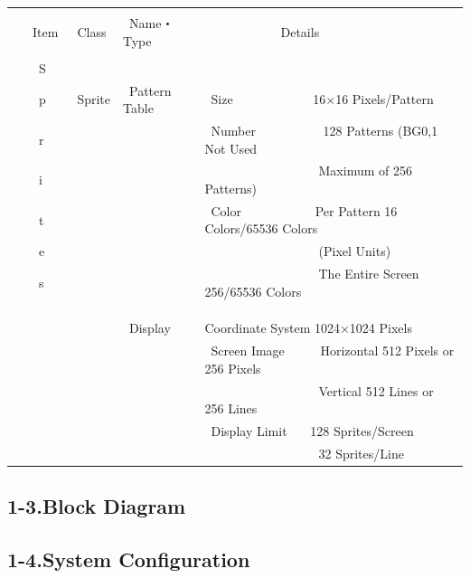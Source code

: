 \documentclass[twoside,a4paper,12pt]{article}
\begin{document}
\begin{tabular}{|p{17mm}|p{20mm}|p{27mm}|p{100mm}|}
\hline
& & &\\
\ \ \ Item & \ Class & \ Name・Type & \ \ \ \ \ \ \ \ \ \ \ \ Details\\[1mm]
\hline
& & &\\[-3mm]
\ \ \ \ S & & &\\[3mm]
\ \ \ \ p & \ Sprite & \ Pattern Table & \ Size \ \ \ \ \ \ \ \ \ \ \ \ 16×16 Pixels/Pattern\\[3mm]
\ \ \ \ r & & & \ Number \ \ \ \ \ \ \ \ \ \ 128 Patterns (BG0,1 Not Used\\[3mm]
\ \ \ \ i & & & \ \ \ \ \ \ \ \ \ \ \ \ \ \ \ \ \ \ Maximum of 256 Patterns)\\[3mm]
\ \ \ \ t & & & \ Color \ \ \ \ \ \ \ \ \ \ \ Per Pattern 16 Colors/65536 Colors\\[3mm]
\ \ \ \ e & & & \ \ \ \ \ \ \ \ \ \ \ \ \ \ \ \ \ \ (Pixel Units)\\[3mm]
\ \ \ \ s & & & \ \ \ \ \ \ \ \ \ \ \ \ \ \ \ \ \ \ The Entire Screen 256/65536 Colors\\
& & &\\
& & &\\
\cline{3-4}
& & &\\[-2mm]
& & \ Display & Coordinate System 1024×1024 Pixels\\[3mm]
& & & \ Screen Image \ \ \ \ \ Horizontal 512 Pixels or 256 Pixels\\[3mm]
& & & \ \ \ \ \ \ \ \ \ \ \ \ \ \ \ \ \ \ Vertical 512 Lines or 256 Lines\\[3mm]
& & & \ Display Limit \ \ \ 128 Sprites/Screen\\[3mm]
& & & \ \ \ \ \ \ \ \ \ \ \ \ \ \ \ \ \ \ 32 Sprites/Line\\
\hline
\end{tabular}

\newpage

\subsection*{1-3.Block Diagram}

\newpage

\subsection*{1-4.System Configuration}
\end{document}
